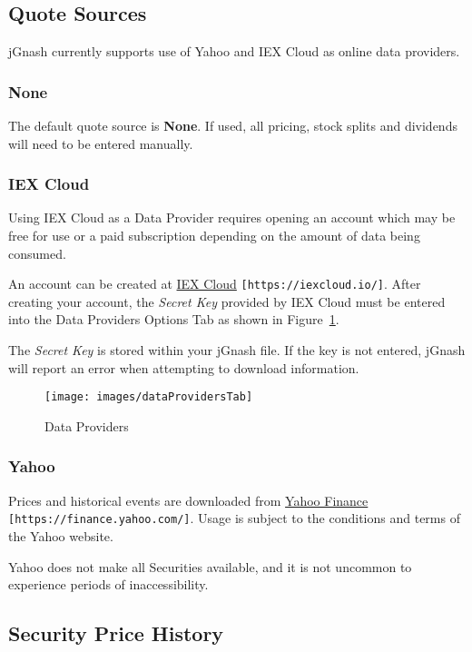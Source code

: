 \documentclass[letterpaper,12pt]{book}
\begin{document}
    \subsection{Quote Sources}
       
    jGnash currently supports use of Yahoo and IEX Cloud as online data providers.  
    
    \subsubsection{None}
    The default quote source is \textbf{None}.  If used, all pricing, stock splits and dividends will
    need to be entered manually.
    
    \subsubsection{IEX Cloud}
    Using IEX Cloud as a Data Provider requires opening an account which may be free for use or a paid
    subscription depending on the amount of data being consumed. 
    
    An account can be created at \href{https://iexcloud.io/}{IEX Cloud} \texttt{[https://iexcloud.io/]}.
    After creating your account, the \textit{Secret Key} provided by IEX Cloud must be entered into the 
    Data Providers Options Tab as shown in Figure~\ref{fig:dataproviders}.
    
    The \textit{Secret Key} is stored within your jGnash file.  If the key is not entered,
    jGnash will report an error when attempting to download information.
    
    \begin{figure}[h]
        \caption{Data Providers}
        \label{fig:dataproviders}
        \texttt{[image: images/dataProvidersTab]}
    \end{figure}
    
    \subsubsection{Yahoo}
    Prices and historical events are downloaded from \href{https://finance.yahoo.com/}{Yahoo Finance} \texttt{[https://finance.yahoo.com/]}.
    Usage is subject to the conditions and terms of the Yahoo website.
    
    Yahoo does not make all Securities available, and it is not uncommon to experience periods of inaccessibility.
    
    \subsection{Security Price History}
    
\end{document}

